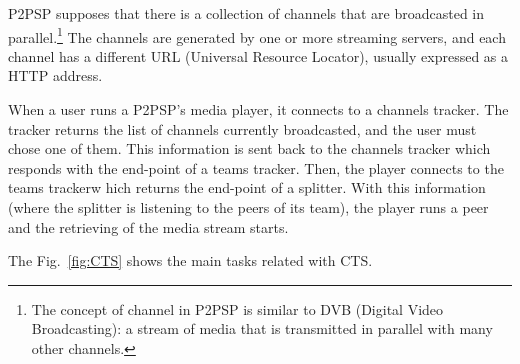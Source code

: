\label{sec:CTS}
\begin{figure*}
   \caption{Tasks involved in the process of
    determing the corresponding team tracker of a given
    channel.\label{fig:CTS}}
\end{figure*}
P2PSP supposes that there is a collection of channels that are
broadcasted in parallel.\footnote{The concept of channel in P2PSP is
  similar to DVB (Digital Video Broadcasting): a stream of media that
  is transmitted in parallel with many other channels.} The channels
are generated by one or more streaming servers, and each channel has a
different URL (Universal Resource Locator), usually expressed as a
HTTP address.

When a user runs a P2PSP's media player, it connects to a channels
tracker. The tracker returns the list of channels currently
broadcasted, and the user must chose one of them. This information is
sent back to the channels tracker which responds with the end-point of
a teams tracker. Then, the player connects to the teams trackerw hich
returns the end-point of a splitter. With this information (where the
splitter is listening to the peers of its team), the player runs a
peer and the retrieving of the media stream starts.

The Fig.~\ref{fig:CTS} shows the main tasks related with CTS. 
